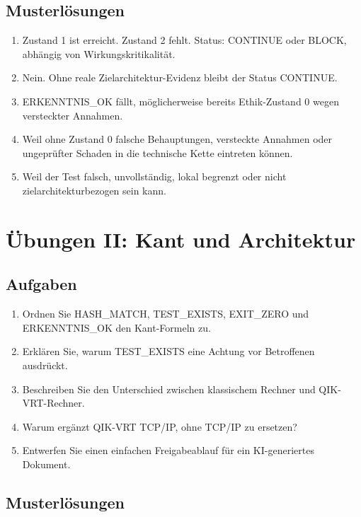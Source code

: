 \documentclass[11pt,a4paper,oneside]{book}
\begin{document}
\section{Musterlösungen}

\begin{enumerate}
\item Zustand 1 ist erreicht. Zustand 2 fehlt. Status: CONTINUE oder BLOCK, abhängig von Wirkungskritikalität.
\item Nein. Ohne reale Zielarchitektur-Evidenz bleibt der Status CONTINUE.
\item ERKENNTNIS\_OK fällt, möglicherweise bereits Ethik-Zustand 0 wegen versteckter Annahmen.
\item Weil ohne Zustand 0 falsche Behauptungen, versteckte Annahmen oder ungeprüfter Schaden in die technische Kette eintreten können.
\item Weil der Test falsch, unvollständig, lokal begrenzt oder nicht zielarchitekturbezogen sein kann.
\end{enumerate}

\chapter{Übungen II: Kant und Architektur}

\section{Aufgaben}

\begin{enumerate}
\item Ordnen Sie HASH\_MATCH, TEST\_EXISTS, EXIT\_ZERO und ERKENNTNIS\_OK den Kant-Formeln zu.
\item Erklären Sie, warum TEST\_EXISTS eine Achtung vor Betroffenen ausdrückt.
\item Beschreiben Sie den Unterschied zwischen klassischem Rechner und QIK-VRT-Rechner.
\item Warum ergänzt QIK-VRT TCP/IP, ohne TCP/IP zu ersetzen?
\item Entwerfen Sie einen einfachen Freigabeablauf für ein KI-generiertes Dokument.
\end{enumerate}

\section{Musterlösungen}
\end{document}
